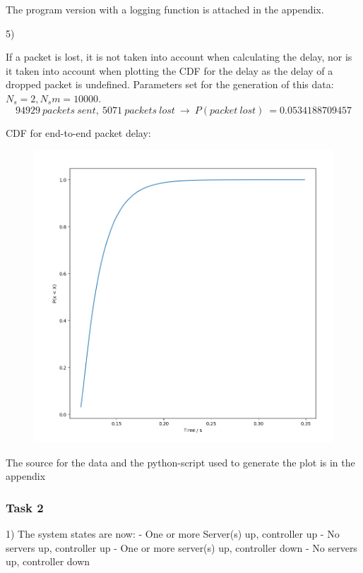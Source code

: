 \documentclass[11pt]{article}
\begin{document}
The program version with a logging function is attached in the appendix.

5)

If a packet is lost, it is not taken into account when calculating the delay, nor is it taken into account when plotting the CDF for the delay as the delay of a dropped packet is undefined.
Parameters set for the generation of this data: $N_s = 2, N_sm = 10000$.
$$94929\ packets\ sent,\ 5071\ packets\ lost\ \rightarrow \ P(packet\ lost)\ = 0.0534188709457$$

CDF for end-to-end packet delay:

\begin{figure}[H]
	\includegraphics[width=\textwidth]{cdf_plot.png}
	\centering
\end{figure}

The source for the data and the python-script used to generate the plot is in the appendix


\subsubsection{Task 2}

1) The system states are now:
- One or more Server(s) up, controller up
- No servers up, controller up
- One or more server(s) up, controller down
- No servers up, controller down
\end{document}
